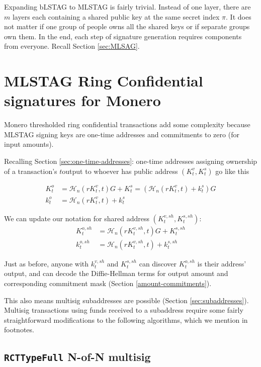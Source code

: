 Expanding bLSTAG to MLSTAG is fairly trivial. Instead of one layer, there are $m$ layers each containing a shared public key at the same secret index $\pi$. It does not matter if one group of people owns all the shared keys or if separate groups own them. In the end, each step of signature generation requires components from everyone. Recall Section \ref{sec:MLSAG}.



\section{MLSTAG Ring Confidential signatures for Monero}
\label{sec:MLSTAG-RingCT}

Monero thresholded ring confidential transactions add some complexity because MLSTAG signing keys are one-time addresses and commitments to zero (for input amounts).

Recalling Section \ref{sec:one-time-addresses}: one-time addresses assigning ownership of a transaction's $t$\nth output to whoever has public address $(K^v_t,K^s_t)$ go like this

\begin{align*}
  K_t^o &= \mathcal{H}_n(r K_t^v, t)G + K_t^s = (\mathcal{H}_n(r K_t^v, t) + k_t^s)G  \\ 
  k_t^o &= \mathcal{H}_n(r K_t^v, t) + k_t^s
\end{align*} 

We can update our notation for shared address $(K^{v,sh}_t,K^{s,sh}_t)$:
\begin{align*}
  K^{o,sh}_t &= \mathcal{H}_n(r K^{v,sh}_t, t)G + K^{s,sh}_t  \\ 
  k^{o,sh}_t &= \mathcal{H}_n(r K^{v,sh}_t, t) + k^{s,sh}_t
\end{align*}

Just as before, anyone with $k^{v,sh}_t$ and $K^{s,sh}_t$ can discover $K^{o,sh}_t$ is their address' output, and can decode the Diffie-Hellman terms for output amount and corresponding commitment mask (Section \ref{amount-commitments}). 

This also means multisig subaddresses are possible (Section \ref{sec:subaddresses}). Multisig transactions using funds received to a subaddress require some fairly straightforward modifications to the following algorithms, which we mention in footnotes.


\subsection{{\tt RCTTypeFull} N-of-N multisig}
\label{sec:rcttypefull-multisig}

